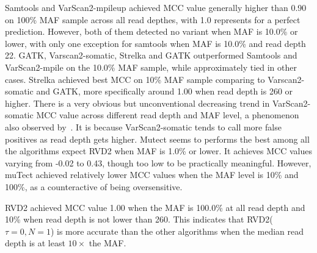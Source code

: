 \documentclass[11pt,reqno]{amsart}
\begin{document}
Samtools and VarScan2-mpileup achieved MCC value generally higher than 0.90 on 100\% MAF sample across all read depthes, with 1.0 represents for a perfect prediction. However, both of them detected no variant when MAF is 10.0\% or lower, with only one exception for samtools when MAF is 10.0\% and read depth 22. GATK, Varscan2-somatic, Strelka and GATK outperformed Samtools and VarScan2-mpile on the 10.0\% MAF sample, while approximately tied in other cases. Strelka achieved best MCC on 10\% MAF sample comparing to Varscan2-somatic and GATK, more specifically around 1.00 when read depth is 260 or higher. There is a very obvious but unconventional decreasing trend in VarScan2-somatic MCC value across different read depth and MAF level, a phenomenon also observed by~\citealp{Stead:2013fu}. It is because VarScan2-somatic tends to call more false positives as read depth gets higher. Mutect seems to performs the best among all the algorithms expect RVD2 when MAF is 1.0\% or lower. It achieves MCC values varying from -0.02 to 0.43, though too low to be practically meaningful. However, muTect achieved relatively lower MCC values when the MAF level is 10\% and 100\%, as a counteractive of being oversensitive.

RVD2 achieved MCC value 1.00 when the MAF is 100.0\% at all read depth and 10\% when read depth is not lower than 260. This indicates that RVD2($\tau=0, N=1$) is more accurate than the other algorithms when the median read depth is at least $10\times$ the MAF.
\end{document}
